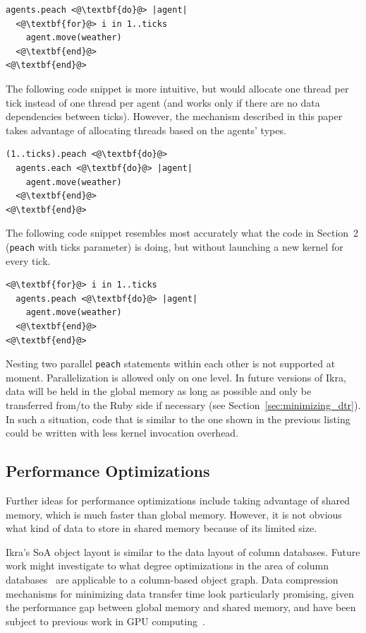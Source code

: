 \documentclass[preprint]{sigplanconf}
\begin{document}
\begin{lstlisting}
agents.peach <@\textbf{do}@> |agent|
  <@\textbf{for}@> i in 1..ticks
    agent.move(weather)
  <@\textbf{end}@>
<@\textbf{end}@>
\end{lstlisting}

The following code snippet is more intuitive, but would allocate one thread per tick instead of one thread per agent (and works only if there are no data dependencies between ticks). However, the mechanism described in this paper takes advantage of allocating threads based on the agents' types.
\begin{lstlisting}
(1..ticks).peach <@\textbf{do}@>
  agents.each <@\textbf{do}@> |agent|
    agent.move(weather)
  <@\textbf{end}@>
<@\textbf{end}@>
\end{lstlisting}

The following code snippet resembles most accurately what the code in Section~2 (\texttt{peach} with ticks parameter) is doing, but without launching a new kernel for every tick.
\begin{lstlisting}
<@\textbf{for}@> i in 1..ticks
  agents.peach <@\textbf{do}@> |agent|
    agent.move(weather)
  <@\textbf{end}@>
<@\textbf{end}@>
\end{lstlisting}

Nesting two parallel \texttt{peach} statements within each other is not supported at moment. Parallelization is allowed only on one level. In future versions of Ikra, data will be held in the global memory as long as possible and only be transferred from/to the Ruby side if necessary (see Section~\ref{sec:minimizing_dtr}). In such a situation, code that is similar to the one shown in the previous listing could be written with less kernel invocation overhead.

\subsection{Performance Optimizations}
Further ideas for performance optimizations include taking advantage of shared memory, which is much faster than global memory. However, it is not obvious what kind of data to store in shared memory because of its limited size.

Ikra's SoA object layout is similar to the data layout of column databases. Future work might investigate to what degree optimizations in the area of column databases~\cite{DBLP:journals/ftdb/AbadiBHIM13, DBLP:journals/corr/LinMPS16} are applicable to a column-based object graph. Data compression mechanisms for minimizing data transfer time look particularly promising, given the performance gap between global memory and shared memory, and have been subject to previous work in GPU computing~\cite{Patel:2012:PLD, Przymus2012}.
\end{document}
